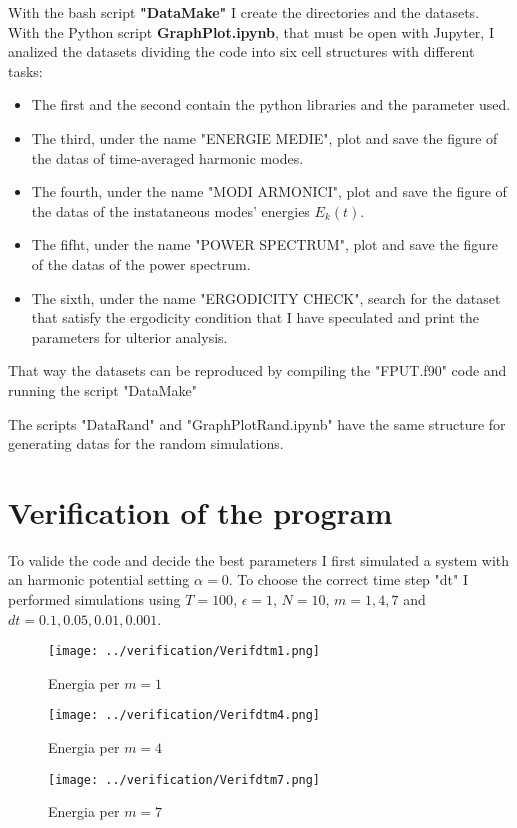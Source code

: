 \documentclass[10pt]{article}
\numberwithin{equation}{section}
\begin{document}
With the bash script \textbf{"DataMake"} I create the directories and the datasets. With the Python script \textbf{GraphPlot.ipynb}, that must be open with Jupyter, I analized the datasets dividing the code into six cell structures with different tasks:
\begin{itemize}
\item The first and the second contain the python libraries and the parameter used.
\item The third, under the name "ENERGIE MEDIE", plot and save the figure of the datas of time-averaged harmonic modes.
\item The fourth, under the name "MODI ARMONICI", plot and save the figure of the datas of the instataneous modes' energies $E_k (t)$.
\item The fifht, under the name "POWER SPECTRUM", plot and save the figure of the datas of the power spectrum.
\item The sixth, under the name "ERGODICITY CHECK", search for the dataset that satisfy the ergodicity condition that I have speculated and print the parameters for ulterior analysis.
\end{itemize}

That way the datasets can be reproduced by compiling the "FPUT.f90" code and running the script "DataMake"

The scripts "DataRand" and "GraphPlotRand.ipynb" have the same structure for generating datas for the random simulations.



\section{Verification of the program}

To valide the code and decide the best parameters I first simulated a system with an harmonic potential setting $\alpha=0$. To choose the correct time step "dt" I performed simulations using $T=100$, $\epsilon = 1$, $N=10$, $m=1,4,7$ and $dt=0.1,0.05,0.01,0.001$. 


\begin{figure}[!htb]
    \texttt{[image: ../verification/Verifdtm1.png]}
    \caption{Energia per $m=1$ }
\endminipage \hfill
{}
    \texttt{[image: ../verification/Verifdtm4.png]}
    \caption{Energia per $m=4$}
\endminipage \hfill
{}
    \texttt{[image: ../verification/Verifdtm7.png]}
    \caption{Energia per $m=7$}
\endminipage 
\end{figure}
\end{document}
